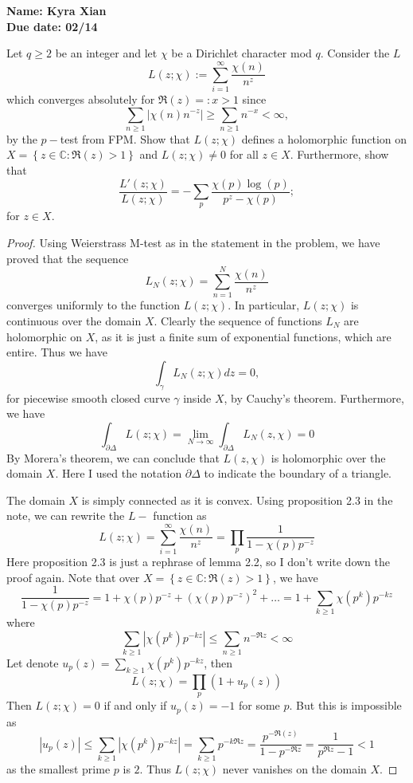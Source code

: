 \documentclass[11pt,letterpaper]{article}
\newcommand{\homework}[2]{\noindent\textbf{Name: Kyra Xian
}{} \hfill \textbf{} \\  \textbf{Due date: #2} \hfill \textbf{}\\}
\newcounter{problem}
\DeclareMathOperator{\1}{\mathbbm{1}}
\begin{document}
\homework{\#}{02/14}


\begin{exercise}
  Let $q \ge 2$ be an integer and let $\chi$ be a Dirichlet character mod $q$. Consider the $L$
  \[L(z;\chi) := \sum_{i=1}^\infty \dfrac{\chi(n)}{n^z}\]
  which converges absolutely for $\Re(z)=:x >1$ since
  \[ \sum_{n\ge 1 }|\chi(n)n^{-z}| \ge \sum_{n\ge 1} n^{-x} <\infty,\]
  by the $p-$test from FPM. Show that $L(z;\chi)$ defines a holomorphic function on $X = \left\lbrace z \in \mathbb{C}: \Re(z)>1 \right\rbrace$
  and $L(z;\chi) \ne 0$ for all $z \in X$. Furthermore, show that
  \[\dfrac{L'(z;\chi)}{L(z;\chi)} = - \sum_p \dfrac{\chi(p)\log(p)}{p^z-\chi(p)};\]
  for $z \in X$.
\end{exercise}
\begin{proof}
  \hfill
  Using Weierstrass M-test as in the statement in the problem, we have proved that the sequence
  \[ L_N(z;\chi) = \sum_{n=1}^N \dfrac{\chi(n)}{n^z}\]
  converges uniformly to the function $L(z;\chi)$. In particular, $L(z;\chi)$ is continuous
  over the domain $X$. Clearly the sequence of functions $L_N$ are holomorphic on $X$, as it is just a finite sum of exponential functions, which are entire. Thus we have
  \[\int_{\gamma} L_N(z; \chi)dz = 0,\]
  for piecewise smooth closed curve $\gamma$ inside $X$, by Cauchy's theorem. Furthermore, we have
  \[\int_{\partial \Delta} L(z;\chi) = \lim_{N \to \infty} \int_{\partial \Delta} L_N(z,\chi) =0\]
  By Morera's theorem, we can conclude that $L(z,\chi)$ is holomorphic over the domain $X$. Here I used the notation  $\partial \Delta$ to indicate the boundary of a triangle.

  The domain $X$ is simply connected as it is convex. Using proposition 2.3 in the note, we can rewrite the $L-$ function as
  \[L(z;\chi ) = \sum_{i=1}^\infty \dfrac{\chi(n)}{n^z} = \prod_p \dfrac{1}{1-\chi(p)p^{-z}}\]
  Here proposition 2.3 is just a rephrase of lemma 2.2, so I don't write down the proof again.
  Note that over $X= \left\lbrace z \in \mathbb{C}: \Re(z)>1 \right\rbrace$, we have
  \[\dfrac{1}{1-\chi(p)p^{-z}} = 1+ \chi(p)p^{-z}+ (\chi(p)p^{-z})^2+\ldots = 1+ \sum_{k\ge 1} \chi(p^k)p^{-kz}\]
  where
  \[\sum_{k\ge 1} |\chi(p^k)p^{-kz}| \le \sum_{n \ge 1} n^{-\Re z}<\infty\]
  Let denote $u_p(z)= \sum_{k\ge 1} \chi(p^k)p^{-kz}$, then
  \[L(z;\chi) = \prod_p \left(1+u_p(z)\right)\]
  Then $L(z;\chi)=0$ if and only if $u_p(z) =-1$ for some $p$. But this is impossible as
  \[|u_p(z)| \le \sum_{k\ge 1} |\chi(p^k)p^{-kz}| = \sum_{k\ge 1} p^{-k\Re z} = \dfrac{p^{-\Re (z)}}{1-p^{-\Re z}} =\dfrac{1}{p^{\Re z}-1} <1\]
  as the smallest prime $p$ is $2$. Thus $L(z;\chi)$ never vanishes on the domain $X$.


\end{proof}
\end{document}
